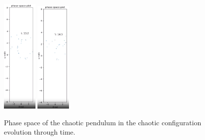 \documentclass[11pt]{article} %
\begin{document}
\begin{figure}[H]
        \includegraphics[width=0.15\textwidth]{phase_4.png}
        \includegraphics[width=0.15\textwidth]{phase_5.png}
        \caption{Phase space of the chaotic pendulum in the chaotic configuration evolution through time.}
    \end{figure}
\end{document}
